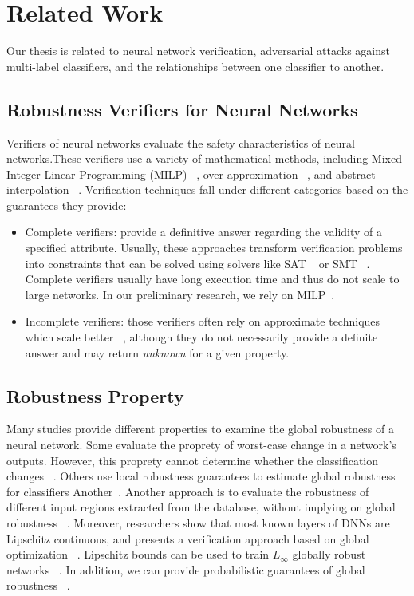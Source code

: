 
\section{Related Work}
Our thesis is related to neural network verification, adversarial attacks against multi-label classifiers, and the relationships between one classifier to another.

\subsection{Robustness Verifiers for Neural Networks}\label{subsec:verifiers}
Verifiers of neural networks evaluate the safety characteristics of neural networks.These verifiers use a variety of mathematical methods, including Mixed-Integer Linear Programming (MILP) ~\cite{singh2018robustness,lazarus2022mixed}, over approximation ~\cite{qin2019verification}, and abstract interpolation ~\cite{ABSTRACTINTER,INCOMPLETE1}. Verification techniques fall under different categories based on the guarantees they provide:
\begin{itemize}
    \item  Complete verifiers: provide a definitive answer regarding the validity of a specified attribute. Usually, these approaches transform verification problems into constraints that can be solved using solvers like SAT ~\cite{SATAPPROACH1,SATAPPROACH2} or SMT ~\cite{NNTOBINARCONSTRAINS,PLANET,Reluplex}. Complete verifiers usually have long execution time and thus do not scale to large networks.
        In our preliminary research, we rely on MILP~\cite{MIPVERIFY}.
    \item Incomplete verifiers: those verifiers often rely on approximate techniques which scale better ~\cite{INCOMPLETE1,INCOMPLETE2}, although they do not necessarily provide a definite answer and may return \emph{unknown} for a given property. 
\end{itemize}

\subsection{Robustness Property}
Many studies provide different properties to examine the global robustness of a neural network.
Some evaluate the proprety of worst-case change in a network’s outputs. However, this proprety cannot determine whether the classification changes ~\cite{Reluplex,EFCIENTGLOBALROBU}. Others use local robustness guarantees to estimate global robustness for classifiers Another~\cite{MEASURENNROBCON,GLOBALPROPERTY}. Another approach is to evaluate the robustness of different input regions extracted from the database, without implying on global robustness  ~\cite{ROBUSTFROMDATASET}. Moreover, researchers show that most known layers of DNNs are Lipschitz continuous, and presents a verification approach based on global optimization ~\cite{ANOTHERGLOBALPROPERTY}. Lipschitz bounds can be used to  train \( L_\infty \) globally robust networks ~\cite{RETHINKLIP}. In addition, we can provide probabilistic guarantees of global robustness ~\cite{GROMA}.

